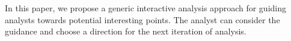 \vspace{5pt}
In this paper, we propose a generic interactive analysis approach for guiding analysts towards potential interesting points. The analyst can consider the guidance and choose a direction for the next iteration of analysis. 

